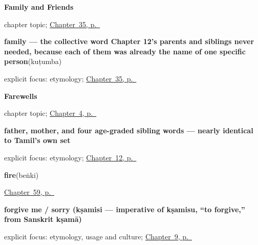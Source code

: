 \noindent\begin{minipage}[t]{\linewidth}
\raggedright
\textbf{Family and Friends}\par
\footnotesize chapter topic; \hyperref[ch:ka-family-and-friends]{Chapter~35, p.~\pageref*{ch:ka-family-and-friends}}
\end{minipage}\par\smallskip

\noindent\begin{minipage}[t]{\linewidth}
\raggedright
\textbf{family — the collective word Chapter 12's parents and siblings never needed, because each of them was already the name of one specific person}\enspace\emph{}\enspace(kuṭumba)\par
\footnotesize explicit focus: etymology; \hyperref[ch:ka-family-and-friends]{Chapter~35, p.~\pageref*{ch:ka-family-and-friends}}
\end{minipage}\par\smallskip

\noindent\begin{minipage}[t]{\linewidth}
\raggedright
\textbf{Farewells}\par
\footnotesize chapter topic; \hyperref[ch:farewells]{Chapter~4, p.~\pageref*{ch:farewells}}
\end{minipage}\par\smallskip

\noindent\begin{minipage}[t]{\linewidth}
\raggedright
\textbf{father, mother, and four age-graded sibling words — nearly identical to Tamil's own set}\enspace\emph{     }\par
\footnotesize explicit focus: etymology; \hyperref[ch:ka-family]{Chapter~12, p.~\pageref*{ch:ka-family}}
\end{minipage}\par\smallskip

\noindent\begin{minipage}[t]{\linewidth}
\raggedright
\textbf{fire}\enspace\emph{}\enspace(beṅki)\par
\footnotesize \hyperref[ch:ka-weather-ground]{Chapter~59, p.~\pageref*{ch:ka-weather-ground}}
\end{minipage}\par\smallskip

\noindent\begin{minipage}[t]{\linewidth}
\raggedright
\textbf{forgive me / sorry (kṣamisi — imperative of kṣamisu, \textquotedblleft{}to forgive,\textquotedblright{} from Sanskrit kṣamā)}\enspace\emph{}\par
\footnotesize explicit focus: etymology, usage and culture; \hyperref[ch:ka-sorry]{Chapter~9, p.~\pageref*{ch:ka-sorry}}
\end{minipage}\par\smallskip

